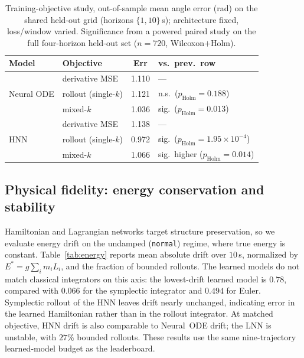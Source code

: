 \documentclass{article}
\begin{document}
\begin{table}[tbp]
\centering\small
\caption{Training-objective study, out-of-sample mean angle error (rad) on the shared
held-out grid (horizons $\{1,10\}$\,s); architecture fixed, loss/window varied. Significance
from a powered paired study on the full four-horizon held-out set ($n{=}720$,
Wilcoxon$+$Holm).}\label{tab:objective}
\begin{tabular}{llcl}
\toprule
Model & Objective & Err & vs.\ prev.\ row \\
\midrule
\multirow{3}{*}{Neural ODE}
 & derivative MSE & 1.110 & --- \\
 & rollout (single-$k$) & 1.121 & n.s.\ ($p_{\mathrm{Holm}}{=}0.188$) \\
 & mixed-$k$ & 1.036 & sig.\ ($p_{\mathrm{Holm}}{=}0.013$) \\
\midrule
\multirow{3}{*}{HNN}
 & derivative MSE & 1.138 & --- \\
 & rollout (single-$k$) & 0.972 & sig.\ ($p_{\mathrm{Holm}}{=}1.95{\times}10^{-4}$) \\
 & mixed-$k$ & 1.066 & sig.\ higher ($p_{\mathrm{Holm}}{=}0.014$) \\
\bottomrule
\end{tabular}
\end{table}

\subsection{Physical fidelity: energy conservation and stability}
\label{sec:energy}
Hamiltonian and Lagrangian networks target structure preservation, so we evaluate energy
drift on the undamped (\texttt{normal}) regime, where true energy is constant. Table~\ref{tab:energy}
reports mean absolute drift over $10$\,s, normalized by $E^{*}{=}g\sum_i m_i L_i$, and the
fraction of bounded rollouts. The learned models do not match classical integrators on this
axis: the lowest-drift learned model is $0.78$, compared with $0.066$ for the symplectic
integrator and $0.494$ for Euler. Symplectic rollout of the HNN leaves drift nearly
unchanged, indicating error in the learned Hamiltonian rather than in the rollout integrator.
At matched objective, HNN drift is also comparable to Neural~ODE drift; the LNN is unstable,
with $27\%$ bounded rollouts. These results use the same nine-trajectory learned-model budget
as the leaderboard.
\end{document}

